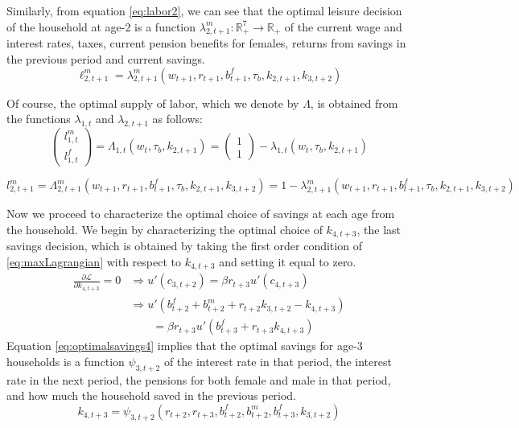 \documentclass[BufferStockTheory]{subfiles}
\begin{document}
Similarly, from equation \eqref{eq:labor2}, we can see that the optimal leisure decision of the household at age-2 is a function $\lambda_{2,t+1}^m:\mathbb{R}_+^7\to\mathbb{R}_+$ of the current wage and interest rates, taxes, current pension benefits for females, returns from savings in the previous period and current savings.
\begin{equation}
	\label{eq:optimalleisure2}
	\ell_{2,t+1}^m =\lambda_{2,t+1}^m(w_{t+1},r_{t+1},b_{t+1}^f, \tau_b,k_{2,t+1},k_{3,t+2})
\end{equation}

Of course, the optimal supply of labor, which we denote by $\Lambda$, is obtained from the functions $\lambda_{1,t}$ and $\lambda_{2,t+1}$ as follows:
\begin{equation}
	\label{eq:optimallabor1}
	\begin{pmatrix}
		l_{1,t}^m \\
		l_{1,t}^f
	\end{pmatrix} = \Lambda_{1,t}(w_t,\tau_b,k_{2,t+1}) =
	\begin{pmatrix}
	1\\1
	\end{pmatrix} - 
	\lambda_{1,t}(w_t,\tau_b,k_{2,t+1})
\end{equation}

\begin{equation}
	\label{eq:optimallabor2}
	l_{2,t+1}^m =\Lambda_{2,t+1}^m(w_{t+1},r_{t+1},b_{t+1}^f, \tau_b,k_{2,t+1},k_{3,t+2})=1-\lambda_{2,t+1}^m(w_{t+1},r_{t+1},b_{t+1}^f, \tau_b,k_{2,t+1},k_{3,t+2})
\end{equation}



Now we proceed to characterize the optimal choice of savings at each age from the household. We begin by characterizing the optimal choice of $k_{4,t+3}$, the last savings decision, which is obtained by taking the first order condition of \eqref{eq:maxLagrangian} with respect to $k_{4,t+3}$ and setting it equal to zero. 
\begin{equation}
	\label{eq:optimalsavings4}
	\begin{aligned}
		\frac{\partial\mathcal{L}}{\partial k_{4,t+3}}=0 & \Rightarrow u'(c_{3,t+2})=\beta r_{t+3}
		u'(c_{4,t+3}) \\
		&\Rightarrow u'\left( b_{t+2}^f+ b_{t+2}^m  + r_{t+2}k_{3,t+2} -k_{4,t+3}\right)\\
		&\qquad =\beta  r_{t+3} u'\left(b_{t+3}^f + r_{t+3}k_{4,t+3}\right)
\end{aligned}
\end{equation}
Equation \eqref{eq:optimalsavings4} implies that the optimal savings for age-3 households is a function $\psi_{3,t+2}$ of the interest rate in that period, the interest rate in the next period, the pensions for both female and male in that period, and how much the household saved in the previous period. 
\begin{equation}
	\label{eq:savingspolicy3}
	k_{4,t+3}=\psi_{3,t+2}(r_{t+2},r_{t+3},b_{t+2}^f, b_{t+2}^m,b_{t+3}^f,k_{3,t+2})
\end{equation}
\end{document}
